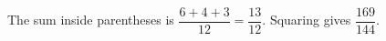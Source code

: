 The sum inside parentheses is $\dfrac{6+4+3}{12}=\dfrac{13}{12}$. Squaring gives $\boxed{\dfrac{169}{144}}$.
